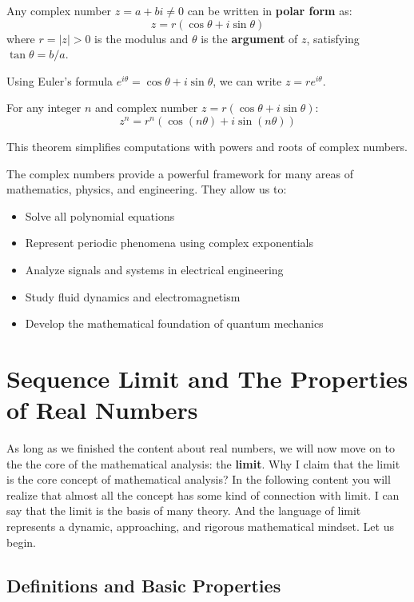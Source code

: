 \documentclass[oneside]{book}
\begin{document}
\begin{definition}
Any complex number $z = a + bi \neq 0$ can be written in \textbf{polar form} as:
\[
z = r(\cos\theta + i\sin\theta)
\]
where $r = |z| > 0$ is the modulus and $\theta$ is the \textbf{argument} of $z$, satisfying $\tan\theta = b/a$.
\end{definition}

Using Euler's formula $e^{i\theta} = \cos\theta + i\sin\theta$, we can write $z = re^{i\theta}$.

\begin{theorem}
For any integer $n$ and complex number $z = r(\cos\theta + i\sin\theta)$:
\[
z^n = r^n(\cos(n\theta) + i\sin(n\theta))
\]
\end{theorem}

This theorem simplifies computations with powers and roots of complex numbers.

The complex numbers provide a powerful framework for many areas of mathematics, physics, and engineering. They allow us to:
\begin{itemize}
    \item Solve all polynomial equations
    \item Represent periodic phenomena using complex exponentials
    \item Analyze signals and systems in electrical engineering
    \item Study fluid dynamics and electromagnetism
    \item Develop the mathematical foundation of quantum mechanics
\end{itemize}

\section{Sequence Limit and The Properties of Real Numbers}

As long as we finished the content about real numbers, we will now move on to the the core of the mathematical analysis: the \textbf{limit}. Why I claim that the limit is the core concept of mathematical analysis? In the following content you will realize that almost all the concept has some kind of connection with limit. I can say that the limit is the basis of many theory. And the language of limit represents a dynamic, approaching, and rigorous mathematical mindset. Let us begin.

\subsection{Definitions and Basic Properties}
\end{document}
